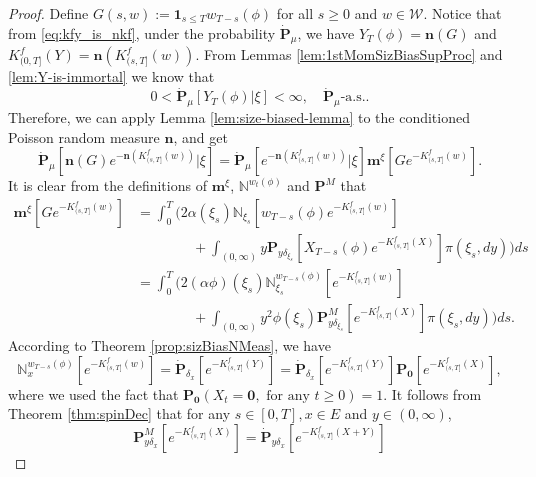 \documentclass[UTF8]{pkuthss}
\theoremstyle{plain}
\theoremstyle{definition}
\numberwithin{equation}{section}
\begin{document}
\begin{proof}
	Define $G(s,w) := \mathbf 1_{s\leq T}w_{T-s}(\phi)$ for all $s\geq 0$ and $w\in\mathcal W$.
	Notice that from \eqref{eq:kfy_is_nkf}, under the probability $\dot {\mathbf P}_\mu$,
	we have $Y_T(\phi) = \mathbf n(G)$ and
	$K_{(0, T]}^f(Y) = \mathbf n(K^f_{(s,T]}(w))$.
	From Lemmas \ref{lem:1stMomSizBiasSupProc} and \ref{lem:Y-is-immortal} we know that
\[
	0
	< \dot{\mathbf P}_{\mu}[Y_T(\phi)|\xi]
	< \infty,
	\quad \dot{\mathbf P}_\mu \text{-a.s.}.
\]
	Therefore, we can apply Lemma \ref{lem:size-biased-lemma} to the conditioned
	Poisson random measure $\mathbf n$, and get
\begin{equation}\label{eq:condSizBiasEquatSpinImmigr}
    \dot{\mathbf P}_\mu [\mathbf n(G) e^{-\mathbf n(K^f_{(s, T]}(w))}|\xi]
	=\dot{\mathbf P}_\mu[e^{-\mathbf n(K^f_{(s, T]}(w))}|\xi]\mathbf m^\xi[Ge^{-K^f_{(s, T]}(w)}].
\end{equation}
	It is clear from the definitions of $\mathbf m^\xi$, $\mathbb N^{w_t(\phi)}$ and $\mathbf P^M$ that
\begin{equation}\label{eq:represent-mGeKf}\begin{split}
    \mathbf m^\xi[Ge^{-K_{(s, T]}^f(w)}]
	&=\int_0^T \Big( 2\alpha(\xi_s)\mathbb N_{\xi_s}[w_{T-s}(\phi)e^{-K^f_{(s,T]}(w)}]\\
	&\qquad\qquad +\int_{(0,\infty)}y\mathbf P_{y\delta_{\xi_s}}[X_{T-s}(\phi)e^{-K^f_{(s,T]}(X)}]\pi(\xi_s,dy)\Big)ds\\
	&=\int_0^T \Big(2(\alpha\phi)(\xi_s)\mathbb N^{w_{T-s}(\phi)}_{\xi_s}[e^{-K^f_{(s,T]}(w)}] \\
	&\qquad\qquad + \int_{(0,\infty)}y^2\phi(\xi_s)\mathbf P^M_{y\delta_{\xi_s}}[e^{-K^f_{(s,T]}(X)}]\pi(\xi_s,dy)\Big)ds.
\end{split}\end{equation}
	According to  Theorem \ref{prop:sizBiasNMeas}, we have
\begin{equation}
\label{eq:represent-NxwTsphi}
	\mathbb N_x^{w_{T-s}(\phi)}[e^{-K^f_{(s,T]}(w)}]
	= \dot{\mathbf P}_{\delta_x}[e^{-K^f_{(s,T]}(Y)}]
	= \dot{\mathbf P}_{\delta_x}[e^{-K^f_{(s,T]}(Y)}]\mathbf P_{\mathbf 0}[e^{-K^f_{(s,T]}(X)}],
\end{equation}
	where we used the fact that $\mathbf P_{\mathbf 0}(X_t=\mathbf 0,\mbox{ for any }t\ge 0)=1$.
It follows from Theorem \ref{thm:spinDec} that for any $s\in [0,T], x\in E$ and $y\in (0,\infty)$,
\begin{equation}\label{eq:represent-PMydeltax}
	\mathbf P^M_{y\delta_x}[e^{-K^f_{(s,T]}(X)}]
	= \dot{\mathbf P}_{y\delta_x}[e^{-K^f_{(s,T]}(X+Y)}]

\end{equation}
\end{proof}
\end{document}
